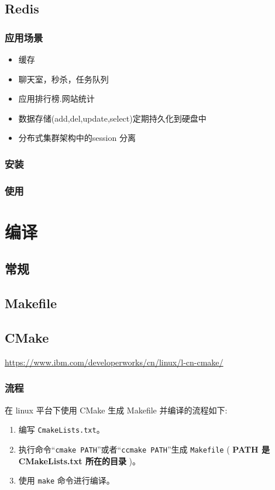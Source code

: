 \documentclass[UTF8,a4paper,8pt]{ctexbook}
\begin{document}
	\section{Redis}
		\subsection{应用场景}
			\begin{itemize}
				\item 缓存
				\item 聊天室，秒杀，任务队列
				\item 应用排行榜.网站统计
				\item 数据存储(add,del,update,select)定期持久化到硬盘中
				\item 分布式集群架构中的session 分离
			\end{itemize}
		\subsection{安装}
		 
		\subsection{使用}
		
		
\chapter{编译}
	\section{常规}
	
	\section{Makefile}
	
	
	\section{CMake}	
		\url{https://www.ibm.com/developerworks/cn/linux/l-cn-cmake/}
		\subsection{流程}
			在 linux 平台下使用 CMake 生成 Makefile 并编译的流程如下:
			
			\begin{enumerate}
				\item 编写 \verb|CmakeLists.txt|。
				\item 执行命令“\verb|cmake PATH|”或者“\verb|ccmake PATH|”生成 \verb|Makefile| ( \textbf{PATH 是 CMakeLists.txt 所在的目录} )。
				\item 使用 \verb|make| 命令进行编译。
			\end{enumerate}
			
\end{document}
